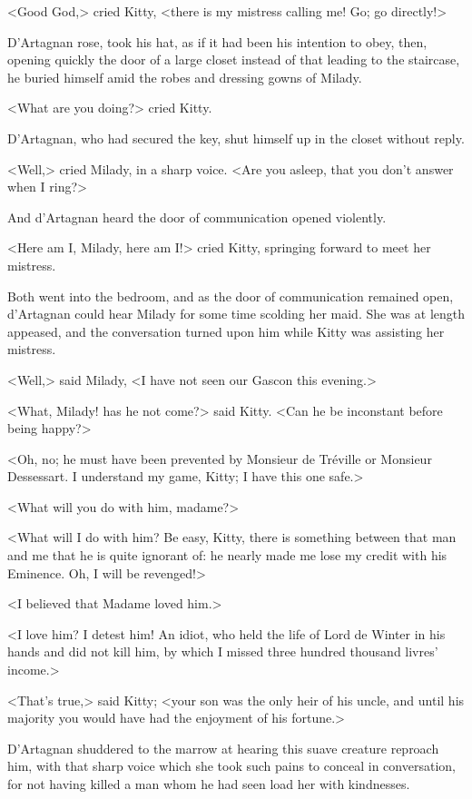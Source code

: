 <Good God,> cried Kitty, <there is my mistress calling me! Go; go directly!> 

D'Artagnan rose, took his hat, as if it had been his intention to obey, then, opening quickly the door of a large closet instead of that leading to the staircase, he buried himself amid the robes and dressing gowns of Milady. 

<What are you doing?> cried Kitty. 

D'Artagnan, who had secured the key, shut himself up in the closet without reply. 

<Well,> cried Milady, in a sharp voice. <Are you asleep, that you don't answer when I ring?> 

And d'Artagnan heard the door of communication opened violently. 

<Here am I, Milady, here am I!> cried Kitty, springing forward to meet her mistress. 

Both went into the bedroom, and as the door of communication remained open, d'Artagnan could hear Milady for some time scolding her maid. She was at length appeased, and the conversation turned upon him while Kitty was assisting her mistress. 

<Well,> said Milady, <I have not seen our Gascon this evening.> 

<What, Milady! has he not come?> said Kitty. <Can he be inconstant before being happy?> 

<Oh, no; he must have been prevented by Monsieur de Tréville or Monsieur Dessessart. I understand my game, Kitty; I have this one safe.> 

<What will you do with him, madame?> 

<What will I do with him? Be easy, Kitty, there is something between that man and me that he is quite ignorant of: he nearly made me lose my credit with his Eminence. Oh, I will be revenged!> 

<I believed that Madame loved him.> 

<I love him? I detest him! An idiot, who held the life of Lord de Winter in his hands and did not kill him, by which I missed three hundred thousand livres' income.> 

<That's true,> said Kitty; <your son was the only heir of his uncle, and until his majority you would have had the enjoyment of his fortune.> 

D'Artagnan shuddered to the marrow at hearing this suave creature reproach him, with that sharp voice which she took such pains to conceal in conversation, for not having killed a man whom he had seen load her with kindnesses. 

